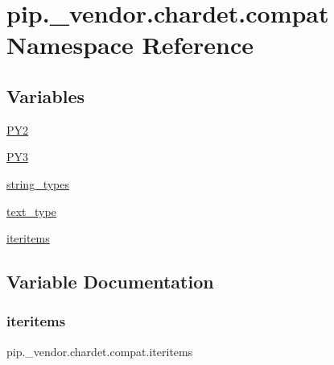 \hypertarget{namespacepip_1_1__vendor_1_1chardet_1_1compat}{}\section{pip.\+\_\+vendor.\+chardet.\+compat Namespace Reference}
\label{namespacepip_1_1__vendor_1_1chardet_1_1compat}
\subsection*{Variables}
\begin{DoxyCompactItemize}
\item 
\hyperlink{namespacepip_1_1__vendor_1_1chardet_1_1compat_aa93e9e118e6ef510710a1d49e6951d64}{P\+Y2}
\item 
\hyperlink{namespacepip_1_1__vendor_1_1chardet_1_1compat_a59e85c06b176650b0a83612f984c3d50}{P\+Y3}
\item 
\hyperlink{namespacepip_1_1__vendor_1_1chardet_1_1compat_a41ac1776be276cef0a27b8b37ab30f8c}{string\+\_\+types}
\item 
\hyperlink{namespacepip_1_1__vendor_1_1chardet_1_1compat_a89998f752ae49fcd750914f6a2a21a47}{text\+\_\+type}
\item 
\hyperlink{namespacepip_1_1__vendor_1_1chardet_1_1compat_a4d983b61a6143123256a8c8eac84dd85}{iteritems}
\end{DoxyCompactItemize}


\subsection{Variable Documentation}
\mbox{\label{namespacepip_1_1__vendor_1_1chardet_1_1compat_a4d983b61a6143123256a8c8eac84dd85}} 
\subsubsection{\texorpdfstring{iteritems}{iteritems}}
{\footnotesize\ttfamily pip.\+\_\+vendor.\+chardet.\+compat.\+iteritems}

\mbox{\label{namespacepip_1_1__vendor_1_1chardet_1_1compat_aa93e9e118e6ef510710a1d49e6951d64}} 
